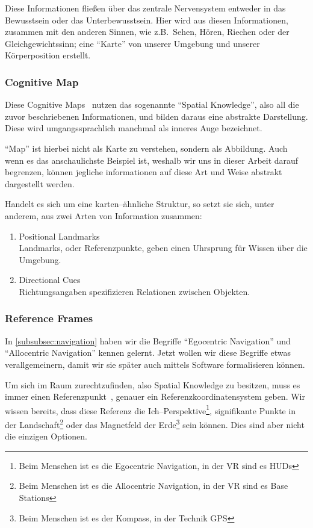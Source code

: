         Diese Informationen fließen über das zentrale Nervensystem entweder in das Bewusstsein oder das Unterbewusstsein.
        Hier wird aus diesen Informationen, zusammen mit den anderen Sinnen, wie z.B.\ Sehen, Hören, Riechen oder der Gleichgewichtssinn; eine \enquote{Karte} von unserer Umgebung und unserer Körperposition erstellt.

    \subsubsection{Cognitive Map}\label{subsubsec:cognitive-map}
        Diese Cognitive Maps~\autocite{wikipedia-contributors-2023I} nutzen das sogenannte \enquote{Spatial Knowledge}, also all die zuvor beschriebenen Informationen, und bilden daraus eine abstrakte Darstellung.
        Diese wird umgangssprachlich manchmal als inneres Auge bezeichnet.

        \enquote{Map} ist hierbei nicht als Karte zu verstehen, sondern als Abbildung.
        Auch wenn es das anschaulichste Beispiel ist, weshalb wir uns in dieser Arbeit darauf begrenzen, können jegliche informationen auf diese Art und Weise abstrakt dargestellt werden.

        Handelt es sich um eine karten--ähnliche Struktur, so setzt sie sich, unter anderem, aus zwei Arten von Information zusammen:
        \begin{enumerate}
            \item Positional Landmarks\\
            Landmarks, oder Referenzpunkte, geben einen Uhrsprung für Wissen über die Umgebung.
            \item Directional Cues\\
            Richtungsangaben spezifizieren Relationen zwischen Objekten.
        \end{enumerate}

    \subsubsection{Reference Frames}\label{subsubsec:reference-frames}
        In \autoref{subsubsec:navigation} haben wir die Begriffe \enquote{Egocentric Navigation} und \enquote{Allocentric Navigation} kennen gelernt.
        Jetzt wollen wir diese Begriffe etwas verallgemeinern, damit wir sie später auch mittels Software formalisieren können.

        Um sich im Raum zurechtzufinden, also Spatial Knowledge zu besitzen, muss es immer einen Referenzpunkt~\autocite{wikipedia-contributors-2023F}, genauer ein Referenzkoordinatensystem geben.
        Wir wissen bereits, dass diese Referenz die Ich--Perspektive\footnote{Beim Menschen ist es die Egocentric Navigation, in der VR sind es HUDs}, signifikante Punkte in der Landschaft\footnote{Beim Menschen ist es die Allocentric Navigation, in der VR sind es Base Stations} oder das Magnetfeld der Erde\footnote{Beim Menschen ist es der Kompass, in der Technik GPS} sein können.
        Dies sind aber nicht die einzigen Optionen.

